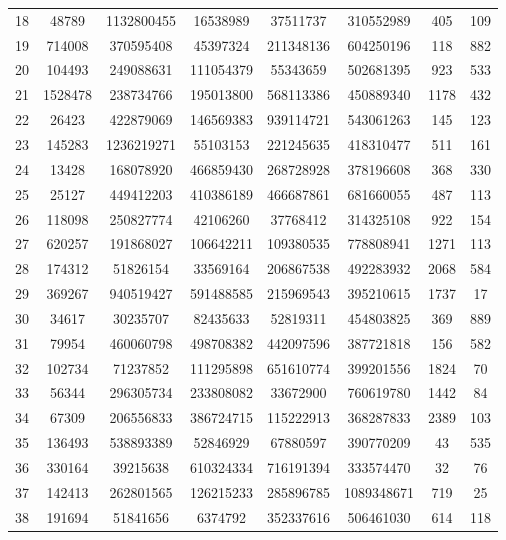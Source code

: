 \documentclass[11pt]{scrartcl}
\theoremstyle{dotlessP}
\theoremstyle{dotlessN}
\theoremstyle{dotN}
\begin{document}
\begin{table}[H]
{\begin{tabular}{c|c|c|c|c|c|c|c}
            18 & 48789 & 1132800455 & 16538989 & 37511737 & 310552989 & 405 & 109 \\
            19 & 714008 & 370595408 & 45397324 & 211348136 & 604250196 & 118 & 882 \\
            20 & 104493 & 249088631 & 111054379 & 55343659 & 502681395 & 923 & 533 \\
            21 & 1528478 & 238734766 & 195013800 & 568113386 & 450889340 & 1178 & 432 \\
            22 & 26423 & 422879069 & 146569383 & 939114721 & 543061263 & 145 & 123 \\
            23 & 145283 & 1236219271 & 55103153 & 221245635 & 418310477 & 511 & 161 \\
            24 & 13428 & 168078920 & 466859430 & 268728928 & 378196608 & 368 & 330 \\
            25 & 25127 & 449412203 & 410386189 & 466687861 & 681660055 & 487 & 113 \\
            26 & 118098 & 250827774 & 42106260 & 37768412 & 314325108 & 922 & 154 \\
            27 & 620257 & 191868027 & 106642211 & 109380535 & 778808941 & 1271 & 113 \\
            28 & 174312 & 51826154 & 33569164 & 206867538 & 492283932 & 2068 & 584 \\
            29 & 369267 & 940519427 & 591488585 & 215969543 & 395210615 & 1737 & 17 \\
            30 & 34617 & 30235707 & 82435633 & 52819311 & 454803825 & 369 & 889 \\
            31 & 79954 & 460060798 & 498708382 & 442097596 & 387721818 & 156 & 582 \\
            32 & 102734 & 71237852 & 111295898 & 651610774 & 399201556 & 1824 & 70 \\
            33 & 56344 & 296305734 & 233808082 & 33672900 & 760619780 & 1442 & 84 \\
            34 & 67309 & 206556833 & 386724715 & 115222913 & 368287833 & 2389 & 103 \\
            35 & 136493 & 538893389 & 52846929 & 67880597 & 390770209 & 43 & 535 \\
            36 & 330164 & 39215638 & 610324334 & 716191394 & 333574470 & 32 & 76 \\
            37 & 142413 & 262801565 & 126215233 & 285896785 & 1089348671 & 719 & 25 \\
            38 & 191694 & 51841656 & 6374792 & 352337616 & 506461030 & 614 & 118 \\

\end{tabular}}
\end{table}
\end{document}
